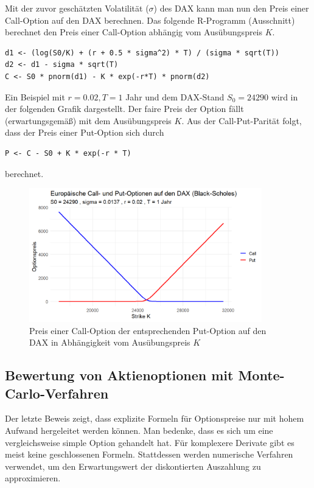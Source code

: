 \begin{bsp}
Mit der zuvor geschätzten Volatilität ($\sigma$) des DAX kann
man nun den Preis einer Call-Option auf den DAX berechnen. Das folgende
R-Programm (Ausschnitt) berechnet den Preis einer Call-Option abhängig
vom Ausübungspreis $K$.

\begin{lstlisting}
d1 <- (log(S0/K) + (r + 0.5 * sigma^2) * T) / (sigma * sqrt(T))
d2 <- d1 - sigma * sqrt(T)
C <- S0 * pnorm(d1) - K * exp(-r*T) * pnorm(d2)
\end{lstlisting}
Ein Beispiel mit $r = 0.02, T = 1$ Jahr und dem DAX-Stand $S_0 = 24290$ wird in
der folgenden Grafik dargestellt. Der faire Preis der Option
fällt (erwartungsgemäß) mit dem Ausübungspreis $K$.
Aus der Call-Put-Parität folgt, dass der Preis einer Put-Option
sich durch

\begin{lstlisting}
P <- C - S0 + K * exp(-r * T)
\end{lstlisting}
berechnet.

\begin{figure}[H]
    \centering
    \includegraphics[width=0.9\textwidth]{images/dax_bs.png}
    \caption{Preis einer Call-Option der entsprechenden Put-Option auf den DAX in Abhängigkeit vom Ausübungspreis $K$}
    \label{fig:dax_bs}
\end{figure}

\end{bsp}

\subsection{Bewertung von Aktienoptionen mit Monte-Carlo-Verfahren}
Der letzte Beweis zeigt, dass explizite Formeln für Optionspreise nur mit hohem
Aufwand hergeleitet werden können. Man bedenke, dass es sich um eine 
vergleichsweise simple Option gehandelt hat. Für komplexere Derivate
gibt es meist keine geschlossenen Formeln. Stattdessen werden numerische Verfahren
verwendet, um den Erwartungswert der diskontierten Auszahlung zu approximieren.


